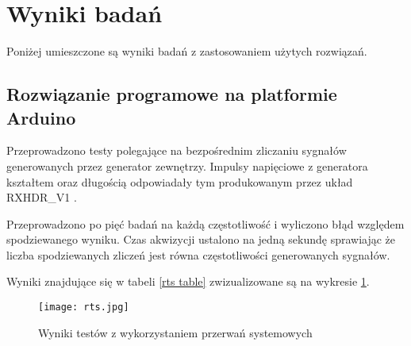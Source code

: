 \section{Wyniki badań}

Poniżej umieszczone są wyniki badań z zastosowaniem użytych rozwiązań. 

\subsection{Rozwiązanie programowe na platformie Arduino}

Przeprowadzono testy polegające na bezpośrednim zliczaniu sygnałów generowanych przez generator zewnętrzy. 
Impulsy napięciowe z generatora kształtem oraz długością odpowiadały tym produkowanym przez układ RXHDR\_V1 \cite{master}.

Przeprowadzono po pięć badań na każdą częstotliwość i wyliczono błąd względem spodziewanego wyniku. 
Czas akwizycji ustalono na jedną sekundę sprawiając że liczba spodziewanych zliczeń jest równa częstotliwości generowanych sygnałów.

Wyniki znajdujące się w tabeli \ref{rts table} zwizualizowane są na wykresie \ref{rts wyniki}.


\begin{figure}[]
        \centering
        \texttt{[image: rts.jpg]}
        \caption{Wyniki testów z wykorzystaniem przerwań systemowych}
        \label{rts wyniki}
\end{figure}

